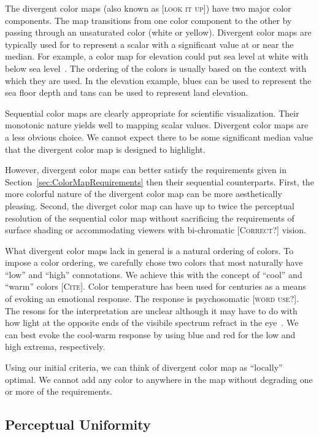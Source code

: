 \documentclass[twocolumn]{article}
\newcommand{\lcite}[1]{~\cite{#1}}
\newcommand{\sticky}[1]{\textsc{[#1]}}
\begin{document}
The divergent color maps (also known as \sticky{look it up}) have two major
color components.  The map transitions from one color component to the
other by passing through an unsaturated color (white or yellow).  Divergent
color maps are typically used for to represent a scalar with a significant
value at or near the median.  For example, a color map for elevation could
put sea level at white with below sea level\lcite{Tufte97}.  The ordering
of the colors is usually based on the context with which they are used.  In
the elevation example, blues can be used to represent the sea floor depth
and tans can be used to represent land elevation.

Sequential color maps are clearly appropriate for scientific visualization.
Their monotonic nature yields well to mapping scalar values.  Divergent
color maps are a less obvious choice.  We cannot expect there to be some
significant median value that the divergent color map is designed to
highlight.

However, divergent color maps can better satisfy the requirements given in
Section~\ref{sec:ColorMapRequirements} then their sequential counterparts.
First, the more colorful nature of the divergent color map can be more
aesthetically pleasing.  Second, the diverget color map can have up to
twice the perceptual resolution of the sequential color map without
sacrificing the requirements of surface shading or accommodating viewers
with bi-chromatic \sticky{Correct?} vision.

What divergent color maps lack in general is a natural ordering of colors.
To impose a color ordering, we carefully chose two colors that most
naturally have ``low'' and ``high'' connotations.  We achieve this with the
concept of ``cool'' and ``warm'' colors \sticky{Cite}.  Color temperature
has been used for centuries as a means of evoking an emotional response.
The response is psychosomatic \sticky{word use?}.  The resons for the
interpretation are unclear although it may have to do with how light at the
opposite ends of the visibile spectrum refract in the eye\lcite{Bailey06}.
We can best evoke the cool-warm response by using blue and red for the low
and high extrema, respectively.

Using our initial criteria, we can think of divergent color map as
``locally'' optimal.  We cannot add any color to anywhere in the map
without degrading one or more of the requirements.


\subsection{Perceptual Uniformity}
\label{sec:PerceptualUniformity}
\end{document}
